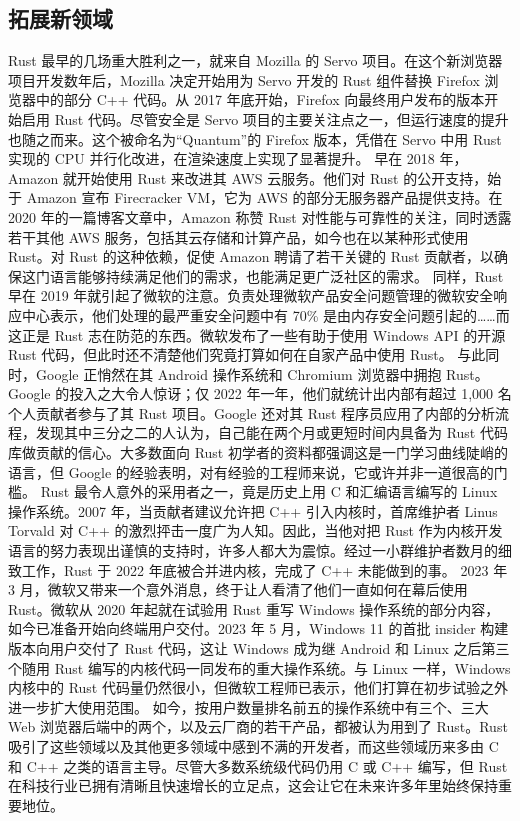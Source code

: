 \subsection{拓展新领域}
\label{idx:idx_9fc025cf}
Rust 最早的几场重大胜利之一，就来自 Mozilla 的 Servo 项目。在这个新浏览器项目开发数年后，Mozilla 决定开始用为 Servo 开发的 Rust 组件替换 Firefox 浏览器中的部分 C++ 代码。从 2017 年底开始，Firefox 向最终用户发布的版本开始启用 Rust 代码。尽管安全是 Servo 项目的主要关注点之一，但运行速度的提升也随之而来。这个被命名为“Quantum”的 Firefox 版本，凭借在 Servo 中用 Rust 实现的 CPU 并行化改进，在渲染速度上实现了显著提升。
早在 2018 年，Amazon 就开始使用 Rust 来改进其 AWS 云服务。他们对 Rust 的公开支持，始于 Amazon 宣布 Firecracker VM，它为 AWS 的部分无服务器产品提供支持。在 2020 年的一篇博客文章中，Amazon 称赞 Rust 对性能与可靠性的关注，同时透露若干其他 AWS 服务，包括其云存储和计算产品，如今也在以某种形式使用 Rust。对 Rust 的这种依赖，促使 Amazon 聘请了若干关键的 Rust 贡献者，以确保这门语言能够持续满足他们的需求，也能满足更广泛社区的需求。
同样，Rust 早在 2019 年就引起了微软的注意。负责处理微软产品安全问题管理的微软安全响应中心表示，他们处理的最严重安全问题中有 70\% 是由内存安全问题引起的……而这正是 Rust 志在防范的东西。微软发布了一些有助于使用 Windows API 的开源 Rust 代码，但此时还不清楚他们究竟打算如何在自家产品中使用 Rust。
与此同时，Google 正悄然在其 Android 操作系统和 Chromium 浏览器中拥抱 Rust。Google 的投入之大令人惊讶；仅 2022 年一年，他们就统计出内部有超过 1,\allowbreak{}000 名个人贡献者参与了其 Rust 项目。Google 还对其 Rust 程序员应用了内部的分析流程，发现其中三分之二的人认为，自己能在两个月或更短时间内具备为 Rust 代码库做贡献的信心。大多数面向 Rust 初学者的资料都强调这是一门学习曲线陡峭的语言，但 Google 的经验表明，对有经验的工程师来说，它或许并非一道很高的门槛。
Rust 最令人意外的采用者之一，竟是历史上用 C 和汇编语言编写的 Linux 操作系统。2007 年，当贡献者建议允许把 C++ 引入内核时，首席维护者 Linus Torvald 对 C++ 的激烈抨击一度广为人知。因此，当他对把 Rust 作为内核开发语言的努力表现出谨慎的支持时，许多人都大为震惊。经过一小群维护者数月的细致工作，Rust 于 2022 年底被合并进内核，完成了 C++ 未能做到的事。
\label{idx:idx_5d8e82a0}
2023 年 3 月，微软又带来一个意外消息，终于让人看清了他们一直如何在幕后使用 Rust。微软从 2020 年起就在试验用 Rust 重写 Windows 操作系统的部分内容，如今已准备开始向终端用户交付。2023 年 5 月，Windows 11 的首批 insider 构建版本向用户交付了 Rust 代码，这让 Windows 成为继 Android 和 Linux 之后第三个随用 Rust 编写的内核代码一同发布的重大操作系统。与 Linux 一样，Windows 内核中的 Rust 代码量仍然很小，但微软工程师已表示，他们打算在初步试验之外进一步扩大使用范围。
如今，按用户数量排名前五的操作系统中有三个、三大 Web 浏览器后端中的两个，以及云厂商的若干产品，都被认为用到了 Rust。Rust 吸引了这些领域以及其他更多领域中感到不满的开发者，而这些领域历来多由 C 和 C++ 之类的语言主导。尽管大多数系统级代码仍用 C 或 C++ 编写，但 Rust 在科技行业已拥有清晰且快速增长的立足点，这会让它在未来许多年里始终保持重要地位。
